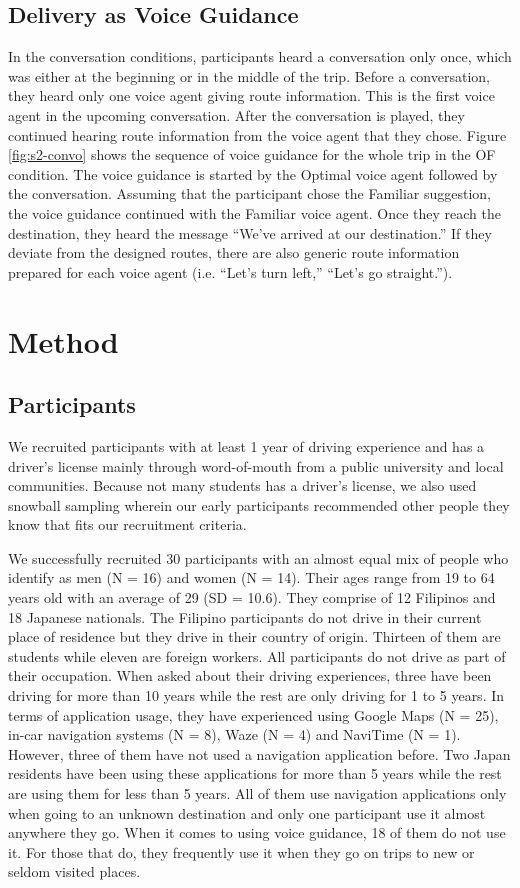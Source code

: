 \subsection{Delivery as Voice Guidance}
In the conversation conditions, participants heard a conversation only once, which was either at the beginning or in the middle of the trip. Before a conversation, they heard only one voice agent giving route information. This is the first voice agent in the upcoming conversation. After the conversation is played, they continued hearing route information from the voice agent that they chose. Figure \ref{fig:s2-convo} shows the sequence of voice guidance for the whole trip in the OF condition. The voice guidance is started by the Optimal voice agent followed by the conversation. Assuming that the participant chose the Familiar suggestion, the voice guidance continued with the Familiar voice agent. Once they reach the destination, they heard the message ``We've arrived at our destination.'' If they deviate from the designed routes, there are also generic route information prepared for each voice agent (i.e. ``Let's turn left,'' ``Let's go straight.'').

\section{Method}

\subsection{Participants}
We recruited participants with at least 1 year of driving experience and has a driver's license mainly through word-of-mouth from a public university and local communities. Because not many students has a driver's license, we also used snowball sampling wherein our early participants recommended other people they know that fits our recruitment criteria. 

We successfully recruited 30 participants with an almost equal mix of people who identify as men (N = 16) and women (N = 14). Their ages range from 19 to 64 years old with an average of 29 (SD = 10.6). They comprise of 12 Filipinos and 18 Japanese nationals. The Filipino participants do not drive in their current place of residence but they drive in their country of origin. Thirteen of them are students while eleven are foreign workers. All participants do not drive as part of their occupation. When asked about their driving experiences, three have been driving for more than 10 years while the rest are only driving for 1 to 5 years. In terms of application usage, they have experienced using Google Maps (N = 25), in-car navigation systems (N = 8), Waze (N = 4) and NaviTime (N = 1). However, three of them have not used a navigation application before. Two Japan residents have been using these applications for more than 5 years while the rest are using them for less than 5 years. All of them use navigation applications only when going to an unknown destination and only one participant use it almost anywhere they go. When it comes to using voice guidance, 18 of them do not use it. For those that do, they frequently use it when they go on trips to new or seldom visited places.


